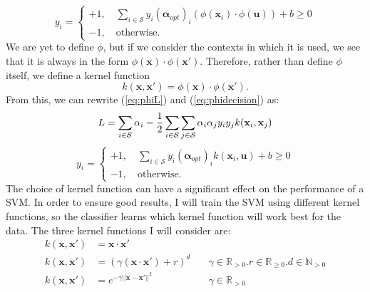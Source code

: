 \documentclass[12pt,a4paper,twoside,openright]{report}
\begin{document}
\begin{equation} \label{eq:phidecision}
	y_i =
	\begin{cases}
		+1, \quad \displaystyle \sum_{i \in \mathcal{S}} y_i(\boldsymbol{\alpha}_{opt})_i (\phi (\mathbf{x}_i) \cdot \phi (\mathbf{u})) + b \ge 0 \\
		-1, \quad \text{otherwise}.
	\end{cases}
\end{equation}
We are yet to define $\phi$, but if we consider the contexts in which it is used, we see that it is always in the form $\phi (\mathbf{x}) \cdot \phi (\mathbf{x}')$. Therefore, rather than define $\phi$ itself, we define a kernel function
\begin{equation}
	k(\mathbf{x}, \mathbf{x}') = \phi (\mathbf{x}) \cdot \phi (\mathbf{x}').
\end{equation}
From this, we can rewrite (\ref{eq:phiL}) and (\ref{eq:phidecision}) as:
\begin{equation}
	L = \sum_{i \in \mathcal{S}} \alpha_i - \frac{1}{2}\sum_{i \in \mathcal{S}} \sum_{j \in \mathcal{S}} \alpha_i \alpha_j y_i y_j k(\mathbf{x}_i, \mathbf{x}_j) \\
\end{equation}
\begin{equation}
	y_i =
	\begin{cases}
		+1, \quad \displaystyle \sum_{i \in \mathcal{S}} y_i(\boldsymbol{\alpha}_{opt})_i k(\mathbf{x}_i, \mathbf{u}) + b \ge 0 \\
		-1, \quad \text{otherwise}.
	\end{cases}
\end{equation}
The choice of kernel function can have a significant effect on the performance of a SVM. In order to ensure good results, I will train the SVM using different kernel functions, so the classifier learns which kernel function will work best for the data. The three kernel functions I will consider are:
\begin{align}
	k(\mathbf{x}, \mathbf{x}') & = \mathbf{x} \cdot \mathbf{x}'& \label{eq:linearkernel} \\
	k(\mathbf{x}, \mathbf{x}') & = (\gamma (\mathbf{x} \cdot \mathbf{x}') + r)^d \quad & \gamma \in \mathbb{R}_{> 0} . r \in \mathbb{R}_{\ge 0} . d \in \mathbb{N}_{> 0} \label{eq:polykernel} \\
	k(\mathbf{x}, \mathbf{x}') & = e^{-\gamma ||\mathbf{x} - \mathbf{x}'||^2} \quad & \gamma \in \mathbb{R}_{> 0} \label{eq:rbfkernel}
\end{align}
\end{document}
